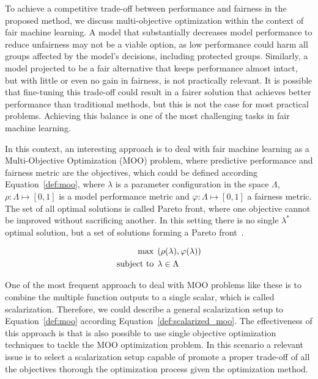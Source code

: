 To achieve a competitive trade-off between performance and fairness in the proposed method, we discuss multi-objective optimization within the context of fair machine learning. A model that substantially decreases model performance to reduce unfairness may not be a viable option, as low performance could harm all groups affected by the model's decisions, including protected groups. Similarly, a model projected to be a fair alternative that keeps performance almost intact, but with little or even no gain in fairness, is not practically relevant. It is possible that fine-tuning this trade-off could result in a fairer solution that achieves better performance than traditional methods, but this is not the case for most practical problems. Achieving this balance is one of the most challenging tasks in fair machine learning.

In this context, an interesting approach is to deal with fair machine learning as a Multi-Objective Optimization (MOO) problem, where predictive performance and fairness metric are the objectives, which could be defined according Equation~\ref{def:moo}, where $\lambda$ is a parameter configuration in the space $\Lambda$, $\rho: \Lambda \mapsto [0,1]$ is a model performance metric and $\varphi: \Lambda \mapsto [0,1]$ a fairness metric. The set of all optimal solutions is called Pareto front, where one objective cannot be improved without sacrificing another. In this setting there is no single $\lambda^*$ optimal solution, but a set of solutions forming a Pareto front~\citep{pareto1906manuale}.

\begin{align}\label{def:moo}
\max &\hspace{1ex} (\rho(\lambda), \varphi(\lambda)) \\
\text{subject to} &\hspace{1ex} \lambda\in\Lambda \nonumber
\end{align}

One of the most frequent approach to deal with MOO problems like these is to combine the multiple function outputs to a single scalar, which is called scalarization. Therefore, we could describe a general scalarization setup to Equation~\ref{def:moo} according Equation~\ref{def:scalarized_moo}. The effectiveness of this approach is that is also possible to use single objective optimization techniques to tackle the MOO optimization problem. In this scenario a relevant issue is to select a scalarization setup capable of promote a proper trade-off of all the objectives thorough the optimization process given the optimization method.


